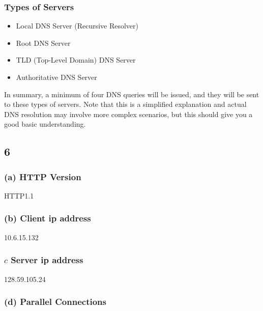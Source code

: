 \documentclass[
]{article}
\providecommand{\tightlist}{%
  \setlength{\itemsep}{0pt}\setlength{\parskip}{0pt}}
\begin{document}
\hypertarget{types-of-servers}{%
\subsubsection{Types of Servers}\label{types-of-servers}}

\begin{itemize}
\tightlist
\item
  Local DNS Server (Recursive Resolver)
\item
  Root DNS Server
\item
  TLD (Top-Level Domain) DNS Server
\item
  Authoritative DNS Server
\end{itemize}

In summary, a minimum of four DNS queries will be issued, and they will
be sent to these types of servers. Note that this is a simplified
explanation and actual DNS resolution may involve more complex
scenarios, but this should give you a good basic understanding.

\hypertarget{section-5}{%
\subsection{6}\label{section-5}}

\hypertarget{a-http-version}{%
\subsubsection{(a) HTTP Version}\label{a-http-version}}

HTTP1.1

\hypertarget{b-client-ip-address}{%
\subsubsection{(b) Client ip address}\label{b-client-ip-address}}

10.6.15.132

\hypertarget{c-server-ip-address}{%
\subsubsection{\texorpdfstring{\(c\) Server ip
address}{c Server ip address}}\label{c-server-ip-address}}

128.59.105.24

\hypertarget{d-parallel-connections}{%
\subsubsection{(d) Parallel Connections}\label{d-parallel-connections}}
\end{document}
